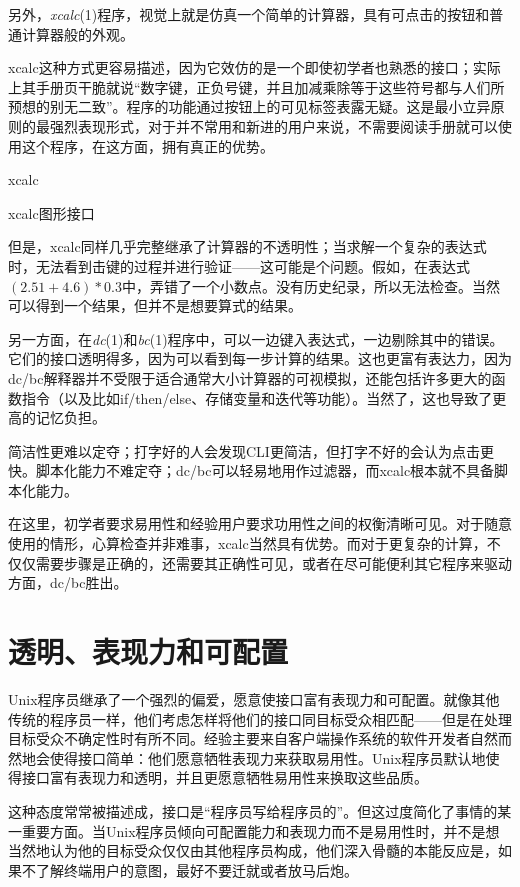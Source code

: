 \documentclass[12pt,oneside]{book}
\begin{document}
\begin{common-format}
另外，\textit{xcalc}(1)程序，视觉上就是仿真一个简单的计算器，具有可点击的按钮和普通计算器般的外观。

xcalc这种方式更容易描述，因为它效仿的是一个即使初学者也熟悉的接口；实际上其手册页干脆就说“数字键，正负号键，并且加减乘除等于这些符号都与人们所预想的别无二致”。程序的功能通过按钮上的可见标签表露无疑。这是最小立异原则的最强烈表现形式，对于并不常用和新进的用户来说，不需要阅读手册就可以使用这个程序，在这方面，拥有真正的优势。

\begin{fig}{xcalc}
\caption{xcalc图形接口}
\label{fig:xcalc}
\end{fig}

但是，xcalc同样几乎完整继承了计算器的不透明性；当求解一个复杂的表达式时，无法看到击键的过程并进行验证——这可能是个问题。假如，在表达式$(2.51+4.6)*0.3$中，弄错了一个小数点。没有历史纪录，所以无法检查。当然可以得到一个结果，但并不是想要算式的结果。

另一方面，在\textit{dc}(1)和\textit{bc}(1)程序中，可以一边键入表达式，一边剔除其中的错误。它们的接口透明得多，因为可以看到每一步计算的结果。这也更富有表达力，因为dc/bc解释器并不受限于适合通常大小计算器的可视模拟，还能包括许多更大的函数指令（以及比如if/then/else、存储变量和迭代等功能）。当然了，这也导致了更高的记忆负担。

简洁性更难以定夺；打字好的人会发现CLI更简洁，但打字不好的会认为点击更快。脚本化能力不难定夺；dc/bc可以轻易地用作过滤器，而xcalc根本就不具备脚本化能力。

在这里，初学者要求易用性和经验用户要求功用性之间的权衡清晰可见。对于随意使用的情形，心算检查并非难事，xcalc当然具有优势。而对于更复杂的计算，不仅仅需要步骤是正确的，还需要其正确性可见，或者在尽可能便利其它程序来驱动方面，dc/bc胜出。

\section{透明、表现力和可配置}
Unix程序员继承了一个强烈的偏爱，愿意使接口富有表现力和可配置。就像其他传统的程序员一样，他们考虑怎样将他们的接口同目标受众相匹配——但是在处理目标受众不确定性时有所不同。经验主要来自客户端操作系统的软件开发者自然而然地会使得接口简单：他们愿意牺牲表现力来获取易用性。Unix程序员默认地使得接口富有表现力和透明，并且更愿意牺牲易用性来换取这些品质。

这种态度常常被描述成，接口是“程序员写给程序员的”。但这过度简化了事情的某一重要方面。当Unix程序员倾向可配置能力和表现力而不是易用性时，并不是想当然地认为他的目标受众仅仅由其他程序员构成，他们深入骨髓的本能反应是，如果不了解终端用户的意图，最好不要迁就或者放马后炮。


\end{common-format}
\end{document}
